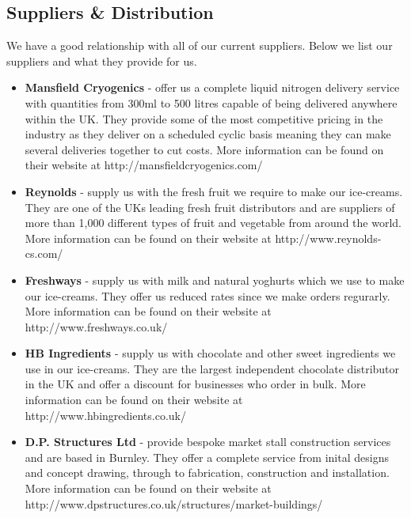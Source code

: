 \documentclass{article}
\begin{document}
  \subsection{Suppliers \& Distribution}

  We have a good relationship with all of our current suppliers. Below we list our suppliers and what they provide for us.

  \begin{itemize}
  \item {\bf Mansfield Cryogenics} - offer us a complete liquid nitrogen delivery service with quantities from 300ml to 500 litres capable of being delivered anywhere within the UK. They provide some of the most competitive pricing in the industry as they deliver on a scheduled cyclic basis meaning they can make several deliveries together to cut costs. More information can be found on their website at http://mansfieldcryogenics.com/

  \item {\bf Reynolds} - supply us with the fresh fruit we require to make our ice-creams. They are one of the UKs leading fresh fruit distributors and are suppliers of more than 1,000 different types of fruit and vegetable from around the world. More information can be found on their website at http://www.reynolds-cs.com/

  \item {\bf Freshways} - supply us with milk and natural yoghurts which we use to make our ice-creams. They offer us reduced rates since we make orders regurarly. More information can be found on their website at http://www.freshways.co.uk/

  \item {\bf HB Ingredients} - supply us with chocolate and other sweet ingredients we use in our ice-creams. They are the largest independent chocolate distributor in the UK and offer a discount for businesses who order in bulk. More information can be found on their website at http://www.hbingredients.co.uk/

  \item {\bf D.P. Structures Ltd} - provide bespoke market stall construction services and are based in Burnley. They offer a complete service from inital designs and concept drawing, through to fabrication, construction and installation. More information can be found on their website at\\
   http://www.dpstructures.co.uk/structures/market-buildings/ \\


\end{itemize}
\end{document}
